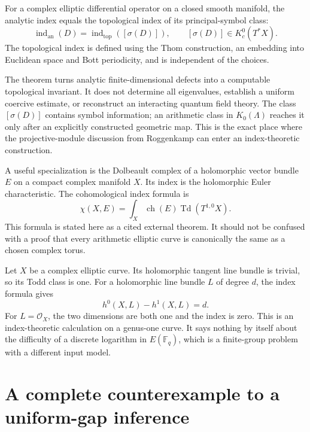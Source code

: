 \begin{theorem}
For a complex elliptic differential operator on a closed smooth manifold, the analytic index equals the topological index of its principal-symbol class:
\[
\operatorname{ind}_{\mathrm{an}}(D)
=\operatorname{ind}_{\mathrm{top}}([\sigma(D)]),
\qquad [\sigma(D)]\in K_c^0(T^*X).
\]
The topological index is defined using the Thom construction, an embedding into Euclidean space and Bott periodicity, and is independent of the choices.\cite{v2AS1968I}
\end{theorem}

The theorem turns analytic finite-dimensional defects into a computable topological invariant. It does not determine all eigenvalues, establish a uniform coercive estimate, or reconstruct an interacting quantum field theory. The class $[\sigma(D)]$ contains symbol information; an arithmetic class in $K_0(\Lambda)$ reaches it only after an explicitly constructed geometric map. This is the exact place where the projective-module discussion from Roggenkamp can enter an index-theoretic construction.

A useful specialization is the Dolbeault complex of a holomorphic vector bundle $E$ on a compact complex manifold $X$. Its index is the holomorphic Euler characteristic. The cohomological index formula is
\[
\chi(X,E)=\int_X\operatorname{ch}(E)\operatorname{Td}(T^{1,0}X).
\]
This formula is stated here as a cited external theorem. It should not be confused with a proof that every arithmetic elliptic curve is canonically the same as a chosen complex torus.\cite{v2AS1968III}

\begin{example}
Let $X$ be a complex elliptic curve. Its holomorphic tangent line bundle is trivial, so its Todd class is one. For a holomorphic line bundle $L$ of degree $d$, the index formula gives
\[
h^0(X,L)-h^1(X,L)=d.
\]
For $L=\mathcal O_X$, the two dimensions are both one and the index is zero. This is an index-theoretic calculation on a genus-one curve. It says nothing by itself about the difficulty of a discrete logarithm in $E(\mathbb F_q)$, which is a finite-group problem with a different input model.
\end{example}

\section{A complete counterexample to a uniform-gap inference}

